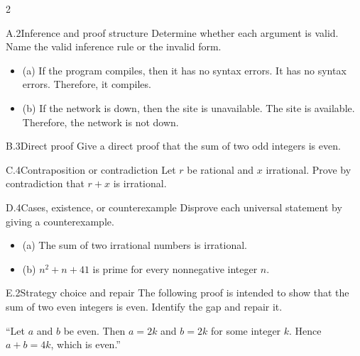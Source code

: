 \documentclass[9pt]{extarticle}
\begin{document}
\begin{multicols}{2}
\begin{CoreProblem}{A.2}{Inference and proof structure}
Determine whether each argument is valid. Name the valid inference rule or the invalid form.
\begin{itemize}
  \item (a) If the program compiles, then it has no syntax errors. It has no syntax errors. Therefore, it compiles.
  \item (b) If the network is down, then the site is unavailable. The site is
        available. Therefore, the network is not down.
\end{itemize}
\end{CoreProblem}
\begin{CoreProblem}{B.3}{Direct proof}
Give a direct proof that the sum of two odd integers is even.
\end{CoreProblem}
\begin{CoreProblem}{C.4}{Contraposition or contradiction}
Let $r$ be rational and $x$ irrational. Prove by contradiction that $r+x$ is irrational.
\end{CoreProblem}
\columnbreak
\begin{CoreProblem}{D.4}{Cases, existence, or counterexample}
Disprove each universal statement by giving a counterexample.
\begin{itemize}
  \item (a) The sum of two irrational numbers is irrational.
  \item (b) $n^2+n+41$ is prime for every nonnegative integer $n$.
\end{itemize}
\end{CoreProblem}
\begin{CoreProblem}{E.2}{Strategy choice and repair}
The following proof is intended to show that the sum of two even integers is even. Identify the gap and repair it.

``Let $a$ and $b$ be even. Then $a=2k$ and $b=2k$ for some integer $k$. Hence $a+b=4k$, which is even.''
\end{CoreProblem}
\end{multicols}
\CoreWorkArea
\FormBreak
{}
\end{document}
